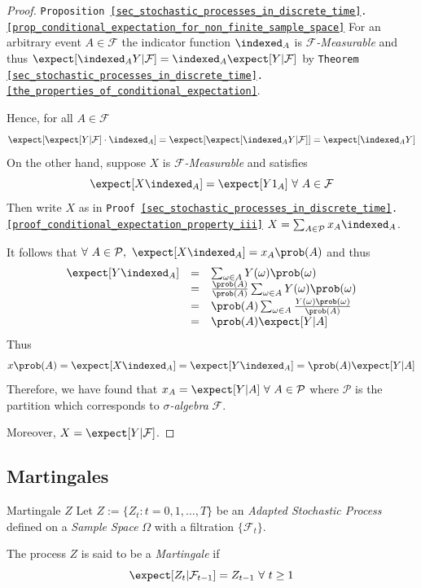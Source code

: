 \documentclass[11pt,a4paper]{article}
\begin{document}
  \begin{proof}{\texttt{Proposition \ref{sec_stochastic_processes_in_discrete_time}.\ref{prop_conditional_expectation_for_non_finite_sample_space}}}
    For an arbitrary event $A\in\mathcal{F}$ the indicator function $\indexed_A$ is \textit{$\mathcal{F}$-Measurable} and thus $\expect[\indexed_AY|\mathcal{F}]=\indexed_A\expect[Y|\mathcal{F}]$ by \texttt{Theorem \ref{sec_stochastic_processes_in_discrete_time}.\ref{the_properties_of_conditional_expectation}}.
    \par Hence, for all $A\in\mathcal{F}$
    \[ \expect[\expect[Y|\mathcal{F}]\cdot\indexed_A]=\expect[\expect[\indexed_AY|\mathcal{F}]]=\expect[\indexed_AY] \]
    On the other hand, suppose $X$ is \textit{$\mathcal{F}$-Measurable} and satisfies
    \[ \expect[X\indexed_A]=\expect[Y1_A]\ \forall\ A\in\mathcal{F} \]
    Then write $X$ as in \texttt{Proof \ref{sec_stochastic_processes_in_discrete_time}.\ref{proof_conditional_expectation_property_iii}} $X=\sum_{A\in\mathcal{P}}x_A\indexed_A$.
    \par It follows that $\forall\ A\in\mathcal{P},\ \expect[X\indexed_A]=x_A\prob(A)$ and thus
    \[\begin{array}{rcl}
      \expect[Y\indexed_A]&=&\sum_{\omega\in A}Y(\omega)\prob(\omega)\\
      &=&\frac{\prob(A)}{\prob(A)}\sum_{\omega\in A}Y(\omega)\prob(\omega)\\
      &=&\prob(A)\sum_{\omega\in A}\frac{Y(\omega)\prob(\omega)}{\prob(A)}\\
      &=&\prob(A)\expect[Y|A]
    \end{array}\]
    Thus
    \[ x\prob(A)=\expect[X\indexed_A]=\expect[Y\indexed_A]=\prob(A)\expect[Y|A] \]
    Therefore, we have found that $x_A=\expect[Y|A]\ \forall\ A\in\mathcal{P}$ where $\mathcal{P}$ is the partition which corresponds to \textit{$\sigma$-algebra} $\mathcal{F}$.
    \par Moreover, $X=\expect[Y|\mathcal{F}]$.
  \end{proof}

\subsection{Martingales}

  \begin{definition}{Martingale $Z$}\label{def_martingales}
    Let $Z:=\{Z_t:t=0,1,\dots,T\}$ be an \textit{Adapted Stochastic Process} defined on a \textit{Sample Space} $\Omega$ with a filtration $\{\mathcal{F}_t\}$.
    \par The process $Z$ is said to be a \textit{Martingale} if
    \[ \expect[Z_t|\mathcal{F}_{t-1}]=Z_{t-1}\ \forall\ t\geq1 \]
  \end{definition}
\end{document}
